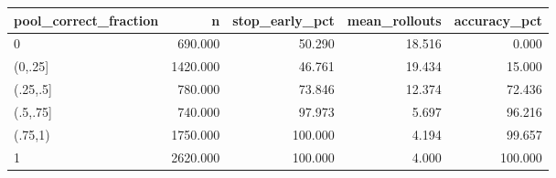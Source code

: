 \begin{tabular}{lrrrr}
\toprule
pool\_correct\_fraction & n & stop\_early\_pct & mean\_rollouts & accuracy\_pct \\
\midrule
0 & 690.000 & 50.290 & 18.516 & 0.000 \\
(0,.25] & 1420.000 & 46.761 & 19.434 & 15.000 \\
(.25,.5] & 780.000 & 73.846 & 12.374 & 72.436 \\
(.5,.75] & 740.000 & 97.973 & 5.697 & 96.216 \\
(.75,1) & 1750.000 & 100.000 & 4.194 & 99.657 \\
1 & 2620.000 & 100.000 & 4.000 & 100.000 \\
\bottomrule
\end{tabular}
